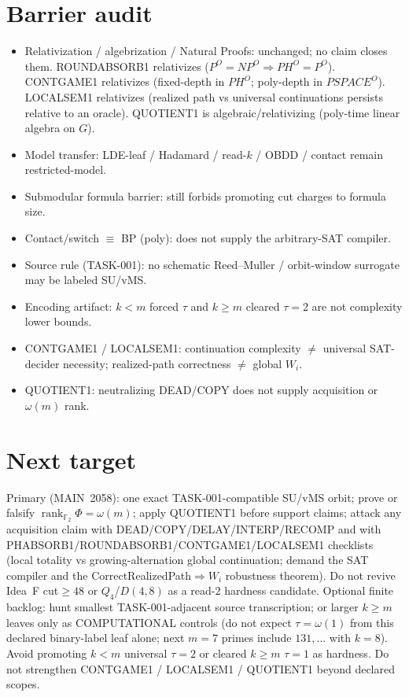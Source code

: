 \documentclass[11pt]{article}
\begin{document}
\section*{Barrier audit}
\begin{itemize}
\item Relativization / algebrization / Natural Proofs: unchanged; no claim closes them.
  ROUNDABSORB1 relativizes ($P^O{=}NP^O\Rightarrow PH^O{=}P^O$).
  CONTGAME1 relativizes (fixed-depth in $PH^O$; poly-depth in $PSPACE^O$).
  LOCALSEM1 relativizes (realized path vs universal continuations persists relative to an oracle).
  QUOTIENT1 is algebraic/relativizing (poly-time linear algebra on $G$).
\item Model transfer: LDE-leaf / Hadamard / read-$k$ / OBDD / contact remain restricted-model.
\item Submodular formula barrier: still forbids promoting cut charges to formula size.
\item Contact/switch $\equiv$ BP (poly): does not supply the arbitrary-SAT compiler.
\item Source rule (TASK-001): no schematic Reed--Muller / orbit-window surrogate may be labeled SU/vMS.
\item Encoding artifact: $k{<}m$ forced $\tau$ and $k{\ge}m$ cleared $\tau{=}2$ are not complexity lower bounds.
\item CONTGAME1 / LOCALSEM1: continuation complexity $\neq$ universal SAT-decider necessity;
  realized-path correctness $\neq$ global $W_i$.
\item QUOTIENT1: neutralizing DEAD/COPY does not supply acquisition or $\omega(m)$ rank.
\end{itemize}

\section*{Next target}
Primary (MAIN~2058): one exact TASK-001-compatible SU/vMS orbit; prove or falsify
$\operatorname{rank}_{\mathbb F_2}\Phi=\omega(m)$; apply QUOTIENT1 before support claims;
attack any acquisition claim with
DEAD/COPY/DELAY/INTERP/RECOMP and with PHABSORB1/ROUNDABSORB1/CONTGAME1/LOCALSEM1 checklists
(local totality vs growing-alternation global continuation; demand the SAT compiler and the
CorrectRealizedPath$\Rightarrow W_i$ robustness theorem).
Do not revive Idea~F cut$\ge48$ or $Q_4$/$D(4,8)$ as a read-$2$ hardness candidate.
Optional finite backlog: hunt smallest TASK-001-adjacent source transcription;
or larger $k{\ge}m$ leaves only as COMPUTATIONAL controls (do not expect $\tau=\omega(1)$
from this declared binary-label leaf alone; next $m{=}7$ primes include $131,\ldots$ with $k{=}8$).
Avoid promoting $k{<}m$ universal $\tau{=}2$ or cleared $k{\ge}m$ $\tau{=}1$ as hardness.
Do not strengthen CONTGAME1 / LOCALSEM1 / QUOTIENT1 beyond declared scopes.
\end{document}
